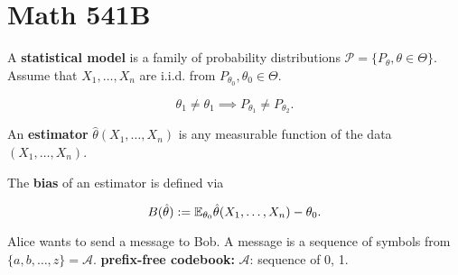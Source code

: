 \section{Math 541B}

\begin{definition} A \textbf{statistical model} is a family of probability distributions \(\mathcal{P} = \{ P_{\theta}, \theta \in \Theta\}\). Assume that \(X_1, \ldots, X_n\) are i.i.d. from \(P_{\theta_0}, \theta_0 \in \Theta\).

\end{definition}

\begin{definition}

\[
\theta_1 \neq \theta_1 \implies P_{\theta_1} \neq P_{\theta_2}.
\]

\end{definition}

\begin{definition}

An \textbf{estimator} \(\hat{\theta}(X_1, \ldots, X_n)\) is any measurable function of the data \((X_1, \ldots, X_n)\).

\end{definition}

\begin{definition}

The \textbf{bias} of an estimator is defined via

\[
B(\hat{\theta}) := \E_{\theta_0} \hat{\theta}(X_1, \ldots, X_n) - \theta_0.
\]

\end{definition}

\begin{example}

Alice wants to send a message to Bob. A message is a sequence of symbols from \(\{a, b, \ldots, z\} = \mathcal{A}\). \textbf{prefix-free codebook:} \(\mathcal{A}\): sequence of 0, 1.

\end{example}

